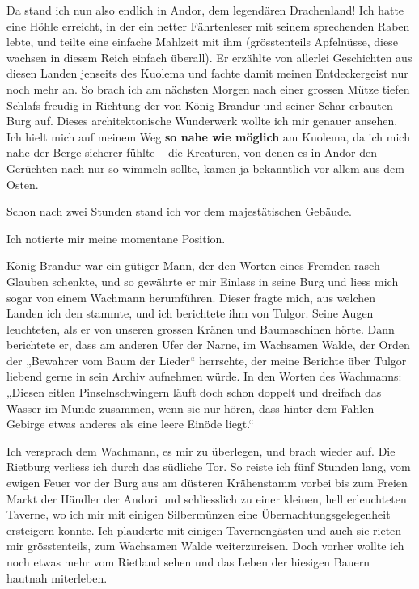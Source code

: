 \documentclass[10pt, a4paper, oneside]{book}
\begin{document}
Da stand ich nun also endlich in Andor, dem legendären Drachenland! Ich hatte eine Höhle erreicht, in der ein netter Fährtenleser mit seinem sprechenden Raben lebte, und teilte eine einfache Mahlzeit mit ihm (grösstenteils Apfelnüsse, diese wachsen in diesem Reich einfach überall). Er erzählte von allerlei Geschichten aus diesen Landen jenseits des Kuolema und fachte damit meinen Entdeckergeist nur noch mehr an. So brach ich am nächsten Morgen nach einer grossen Mütze tiefen Schlafs freudig in Richtung der von König Brandur und seiner Schar erbauten Burg auf. Dieses architektonische Wunderwerk wollte ich mir genauer ansehen. Ich hielt mich auf meinem Weg \textbf{so nahe wie möglich} am Kuolema, da ich mich nahe der Berge sicherer fühlte – die Kreaturen, von denen es in Andor den Gerüchten nach nur so wimmeln sollte, kamen ja bekanntlich vor allem aus dem Osten.

Schon nach zwei Stunden stand ich vor dem majestätischen Gebäude.

Ich notierte mir meine momentane Position.\bigskip



König Brandur war ein gütiger Mann, der den Worten eines Fremden rasch Glauben schenkte, und so gewährte er mir Einlass in seine Burg und liess mich sogar von einem Wachmann herumführen. Dieser fragte mich, aus welchen Landen ich den stammte, und ich berichtete ihm von Tulgor. Seine Augen leuchteten, als er von unseren grossen Kränen und Baumaschinen hörte. Dann berichtete er, dass am anderen Ufer der Narne, im Wachsamen Walde, der Orden der „Bewahrer vom Baum der Lieder“ herrschte, der meine Berichte über Tulgor liebend gerne in sein Archiv aufnehmen würde. In den Worten des Wachmanns: „Diesen eitlen Pinselnschwingern läuft doch schon doppelt und dreifach das Wasser im Munde zusammen, wenn sie nur hören, dass hinter dem Fahlen Gebirge etwas anderes als eine leere Einöde liegt.“

Ich versprach dem Wachmann, es mir zu überlegen, und brach wieder auf. Die Rietburg verliess ich durch das südliche Tor. So reiste ich fünf Stunden lang, vom ewigen Feuer vor der Burg aus am düsteren Krähenstamm vorbei bis zum Freien Markt der Händler der Andori und schliesslich zu einer kleinen, hell erleuchteten Taverne, wo ich mir mit einigen Silbermünzen eine Übernachtungsgelegenheit ersteigern konnte. Ich plauderte mit einigen Tavernengästen und auch sie rieten mir grösstenteils, zum Wachsamen Walde weiterzureisen. Doch vorher wollte ich noch etwas mehr vom Rietland sehen und das Leben der hiesigen Bauern hautnah miterleben.
\end{document}
